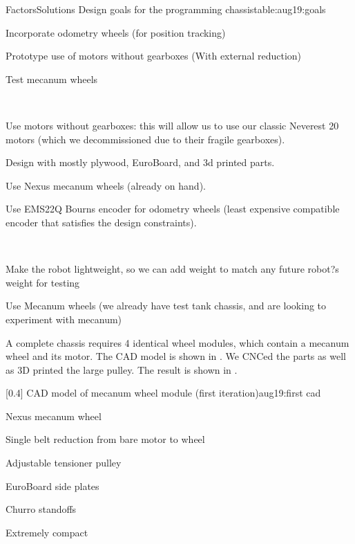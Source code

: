 \begin{Meeting}[Preseason]
\begin{DescriptionTable}{Factors}{Solutions}%
    {Design goals for the programming chassis}{table:aug19:goals}
    {
      \item Incorporate odometry wheels (for position tracking)
      \item Prototype use of motors without gearboxes (With external reduction)
      \item Test mecanum wheels 
    } \\ \hline
    {
      \item Use motors without gearboxes: this will allow us to use
        our classic Neverest 20 motors (which we decommissioned due to
        their fragile gearboxes).
      \item Design with mostly plywood, EuroBoard, and 3d printed parts.
      \item Use Nexus mecanum wheels (already on hand).
      \item Use EMS22Q Bourns encoder for odometry wheels (least
        expensive compatible encoder that satisfies the design
        constraints).  } \\ \hline
  { 
    \item Make the robot lightweight, so we can add weight to match
      any future robot?s weight for testing
    \item Use Mecanum wheels (we already have test tank chassis, and
      are looking to experiment with mecanum) }
\end{DescriptionTable}



A complete chassis requires 4 identical wheel modules, which contain a
mecanum wheel and its motor. The CAD model is shown in
. We CNCed the parts as well as 3D printed
the large pulley. The result is shown in .

[0.4]%
  {CAD model of mecanum wheel module (first iteration)}{aug19:first cad}
  {
  \begin{compactitem}
    \item Nexus mecanum wheel
    \item Single belt reduction from bare motor to wheel
    \item Adjustable tensioner pulley
    \item EuroBoard side plates
    \item Churro standoffs
    \item Extremely compact
    \end{compactitem}
  }
  

\end{Meeting}
